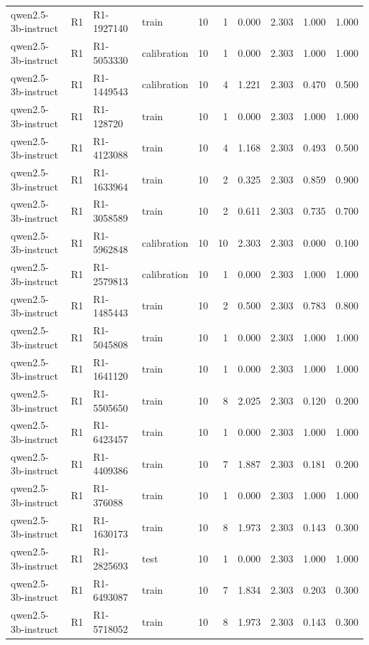 \begin{table}
\begin{tabular}{llllrrrrrr}
qwen2.5-3b-instruct & R1 & R1-1927140 & train & 10 & 1 & 0.000 & 2.303 & 1.000 & 1.000 \\
qwen2.5-3b-instruct & R1 & R1-5053330 & calibration & 10 & 1 & 0.000 & 2.303 & 1.000 & 1.000 \\
qwen2.5-3b-instruct & R1 & R1-1449543 & calibration & 10 & 4 & 1.221 & 2.303 & 0.470 & 0.500 \\
qwen2.5-3b-instruct & R1 & R1-128720 & train & 10 & 1 & 0.000 & 2.303 & 1.000 & 1.000 \\
qwen2.5-3b-instruct & R1 & R1-4123088 & train & 10 & 4 & 1.168 & 2.303 & 0.493 & 0.500 \\
qwen2.5-3b-instruct & R1 & R1-1633964 & train & 10 & 2 & 0.325 & 2.303 & 0.859 & 0.900 \\
qwen2.5-3b-instruct & R1 & R1-3058589 & train & 10 & 2 & 0.611 & 2.303 & 0.735 & 0.700 \\
qwen2.5-3b-instruct & R1 & R1-5962848 & calibration & 10 & 10 & 2.303 & 2.303 & 0.000 & 0.100 \\
qwen2.5-3b-instruct & R1 & R1-2579813 & calibration & 10 & 1 & 0.000 & 2.303 & 1.000 & 1.000 \\
qwen2.5-3b-instruct & R1 & R1-1485443 & train & 10 & 2 & 0.500 & 2.303 & 0.783 & 0.800 \\
qwen2.5-3b-instruct & R1 & R1-5045808 & train & 10 & 1 & 0.000 & 2.303 & 1.000 & 1.000 \\
qwen2.5-3b-instruct & R1 & R1-1641120 & train & 10 & 1 & 0.000 & 2.303 & 1.000 & 1.000 \\
qwen2.5-3b-instruct & R1 & R1-5505650 & train & 10 & 8 & 2.025 & 2.303 & 0.120 & 0.200 \\
qwen2.5-3b-instruct & R1 & R1-6423457 & train & 10 & 1 & 0.000 & 2.303 & 1.000 & 1.000 \\
qwen2.5-3b-instruct & R1 & R1-4409386 & train & 10 & 7 & 1.887 & 2.303 & 0.181 & 0.200 \\
qwen2.5-3b-instruct & R1 & R1-376088 & train & 10 & 1 & 0.000 & 2.303 & 1.000 & 1.000 \\
qwen2.5-3b-instruct & R1 & R1-1630173 & train & 10 & 8 & 1.973 & 2.303 & 0.143 & 0.300 \\
qwen2.5-3b-instruct & R1 & R1-2825693 & test & 10 & 1 & 0.000 & 2.303 & 1.000 & 1.000 \\
qwen2.5-3b-instruct & R1 & R1-6493087 & train & 10 & 7 & 1.834 & 2.303 & 0.203 & 0.300 \\
qwen2.5-3b-instruct & R1 & R1-5718052 & train & 10 & 8 & 1.973 & 2.303 & 0.143 & 0.300 \\

\end{tabular}
\end{table}
